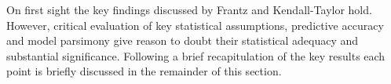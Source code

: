On first sight the key findings discussed by Frantz and 
Kendall-Taylor hold. However, critical evaluation of key
statistical assumptions, predictive accuracy and model
parsimony give reason to doubt their statistical adequacy 
and substantial significance. Following a brief recapitulation of the key results each point is briefly discussed in the remainder of this section.


